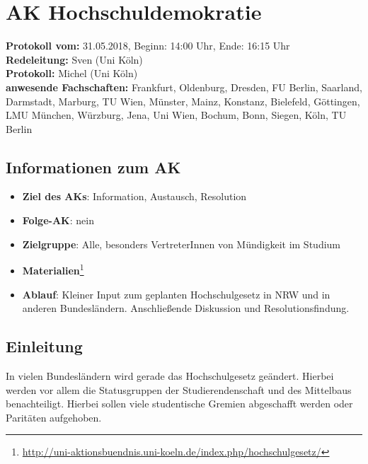 
\section{AK Hochschuldemokratie}

  \textbf{Protokoll vom:} 31.05.2018, %
  Beginn: 14:00 Uhr, %
  Ende: 16:15 Uhr \\ %
  \textbf{Redeleitung:} Sven (Uni Köln) \\
  \textbf{Protokoll:} Michel (Uni Köln) \\
  \textbf{anwesende Fachschaften:} Frankfurt, Oldenburg, Dresden, FU Berlin, Saarland, Darmstadt, Marburg, TU Wien, Münster, Mainz, Konstanz, Bielefeld, Göttingen, LMU München, Würzburg, Jena, Uni Wien, Bochum, Bonn, Siegen, Köln, TU Berlin

  \subsection*{Informationen zum AK}
    \begin{itemize}
      \item \textbf{Ziel des AKs}: Information, Austausch, Resolution
      \item \textbf{Folge-AK}: nein
      \item \textbf{Zielgruppe}: Alle, besonders VertreterInnen von Mündigkeit im Studium
      \item \textbf{Materialien}\footnote{\url{http://uni-aktionsbuendnis.uni-koeln.de/index.php/hochschulgesetz/}}
      \item \textbf{Ablauf}: Kleiner Input zum geplanten Hochschulgesetz in NRW und in anderen Bundesländern. Anschließende Diskussion und Resolutionsfindung.
    \end{itemize}

  \subsection*{Einleitung}
    In vielen Bundesländern wird gerade das Hochschulgesetz geändert. Hierbei werden vor allem die Statusgruppen der Studierendenschaft und des Mittelbaus benachteiligt. Hierbei sollen viele studentische Gremien abgeschafft werden oder Paritäten aufgehoben. \\

